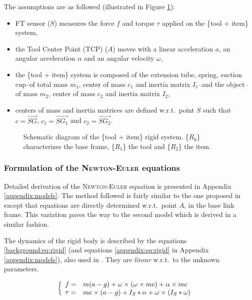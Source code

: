 \documentclass[/home/francois/latex/report/main.tex]{subfiles}
\begin{document}
The assumptions are as followed (illustrated in Figure \ref{fig:tikz:one_body}):

\begin{itemize}
 \item \ac{FT} sensor ($S$) measures the force $f$ and torque $\tau$ applied on the \{tool + item\} system,
 \item the Tool Center Point (TCP) ($A$) moves with a linear acceleration $a$, an angular acceleration $\alpha$ and an angular velocity $\omega$,
 \item the \{tool + item\} system is composed of the extension tube, spring, suction cup–of total mass $m_1$, center of mass $c_1$  and inertia matrix $I_1$–and the object–of mass $m_2$, center of mass $c_2$ and inertia matrix $I_2$,
 \item centers of mass and inertia matrices are defined w.r.t.\ point $S$ such that $c = \overrightarrow{SG}$, $c_1 = \overrightarrow{SG_1}$ and $c_2 = \overrightarrow{SG_2}$.
\end{itemize}

\begin{figure}[h]
\centering
   \caption{Schematic diagram of the \{tool + item\} rigid system. \{$R_0$\} characterizes the base frame, \{$R_1$\} the tool and \{$R_2$\} the item.}
   \label{fig:tikz:one_body}
\end{figure}

\subsubsection{Formulation of the \textsc{Newton-Euler} equations}
\label{subsubsection:background_newton_equation}

Detailed derivation of the \textsc{Newton-Euler} equation is presented in Appendix \ref{appendix:models}. The method followed is fairly similar to the one proposed in \cite{An1985} except that equations are directly determined w.r.t.\ point $A$, in the base link frame. This variation paves the way to the second model which is derived in a similar fashion.

The dynamics of the rigid body is described by the equations \ref{background:eq:rigid} (and equations \ref{appendix:eq:rigid} in Appendix \ref{appendix:models}), also used in \cite{Kubus2008, Kubus2007, Kubus2014, Farsoni2018}. They are \textit{linear} w.r.t.\ to the unknown parameters.

\begin{equation}
 \label{background:eq:rigid}
 \left \{
 \begin{array}{l l}
  f =    & m (a - g) + \omega \times (\omega \times m c) + \alpha \times m c \\
  \tau = & m c \times (a - g)
  + I_{S} \ast \alpha + \omega \times (I_{S} \ast \omega)
 \end{array}
 \right.
\end{equation}
\end{document}

